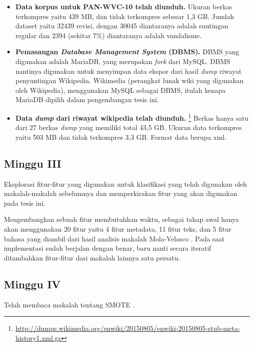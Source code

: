\begin{itemize}
	\item \textbf{Data korpus untuk PAN-WVC-10 telah diunduh.}
Ukuran berkas terkompres yaitu 439 MB, dan tidak terkompres sebesar 1,3 GB.
Jumlah dataset yaitu 32439 revisi, dengan 30045 diantaranya adalah suntingan regular dan 2394 (sekitar 7\%) diantaranya adalah vandalisme.

	\item \textbf{Pemasangan \textit{Database Management System} (DBMS).}
DBMS yang digunakan adalah MariaDB, yang merupakan \textit{fork} dari MySQL.
DBMS nantinya digunakan untuk menyimpan data ekspor dari hasil \textit{dump} riwayat penyuntingan Wikipedia.
Wikimedia (perangkat lunak wiki yang digunakan oleh Wikipedia), menggunakan MySQL sebagai DBMS, itulah kenapa MariaDB dipilih dalam pengembangan tesis ini.

	\item \textbf{Data \textit{dump} dari riwayat wikipedia telah diunduh.} \footnote{\RaggedRight\url{http://dumps.wikimedia.org/enwiki/20150805/enwiki-20150805-stub-meta-history1.xml.gz}}
Berkas hanya satu dari 27 berkas \textit{dump} yang memiliki total 43,5 GB.
Ukuran data terkompres yaitu 503 MB dan tidak terkompres 3,3 GB.
Format data berupa xml.
\end{itemize}

\subsection{Minggu III}

Eksplorasi fitur-fitur yang digunakan untuk klasifikasi yang telah digunakan oleh makalah-makalah sebelumnya dan memperkirakan fitur yang akan digunakan pada tesis ini.

Mengembangkan sebuah fitur membutuhkan waktu, sebagai tahap awal hanya akan menggunakan 20 fitur yaitu 4 fitur metadata, 11 fitur teks, dan 5 fitur bahasa yang diambil dari hasil analisis makalah Mola-Velasco \cite{mola2012wikipedia}. Pada saat implementasi sudah berjalan dengan benar, baru nanti secara iteratif ditambahkan fitur-fitur dari makalah lainnya satu persatu.

\subsection{Minggu IV}

Telah membaca makalah tentang SMOTE \cite{chawla2002smote}.


